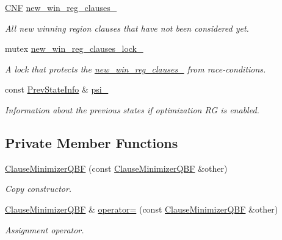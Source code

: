 \begin{DoxyCompactItemize}
\hyperlink{classCNF}{C\-N\-F} \hyperlink{classClauseMinimizerQBF_abe2ed21eb5d92ef978ad6aa83ed8af7e}{new\-\_\-win\-\_\-reg\-\_\-clauses\-\_\-}
\begin{DoxyCompactList}\small\item\em All new winning region clauses that have not been considered yet. \end{DoxyCompactList}\item 
mutex \hyperlink{classClauseMinimizerQBF_aa59e412c42a4f160c6ed1d85d7c4612d}{new\-\_\-win\-\_\-reg\-\_\-clauses\-\_\-lock\-\_\-}
\begin{DoxyCompactList}\small\item\em A lock that protects the \hyperlink{classClauseMinimizerQBF_abe2ed21eb5d92ef978ad6aa83ed8af7e}{new\-\_\-win\-\_\-reg\-\_\-clauses\-\_\-} from race-\/conditions. \end{DoxyCompactList}\item 
const \hyperlink{classPrevStateInfo}{Prev\-State\-Info} \& \hyperlink{classClauseMinimizerQBF_a3423321ecad44cf8b1c9b5f5afb17d27}{psi\-\_\-}
\begin{DoxyCompactList}\small\item\em Information about the previous states if optimization R\-G is enabled. \end{DoxyCompactList}\end{DoxyCompactItemize}
\subsection*{Private Member Functions}
\begin{DoxyCompactItemize}
\item 
\hyperlink{classClauseMinimizerQBF_ac6392b5d3f312013b93d60d3a6f47283}{Clause\-Minimizer\-Q\-B\-F} (const \hyperlink{classClauseMinimizerQBF}{Clause\-Minimizer\-Q\-B\-F} \&other)
\begin{DoxyCompactList}\small\item\em Copy constructor. \end{DoxyCompactList}\item 
\hyperlink{classClauseMinimizerQBF}{Clause\-Minimizer\-Q\-B\-F} \& \hyperlink{classClauseMinimizerQBF_a42489977ed8a763f6ea8912c6d45218f}{operator=} (const \hyperlink{classClauseMinimizerQBF}{Clause\-Minimizer\-Q\-B\-F} \&other)
\begin{DoxyCompactList}\small\item\em Assignment operator. \end{DoxyCompactList}\end{DoxyCompactItemize}


